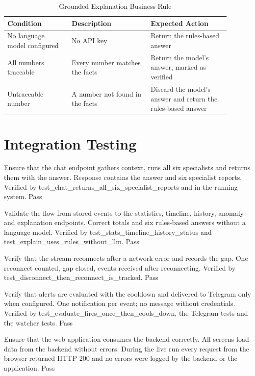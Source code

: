 {\renewcommand{\arraystretch}{1.3}
\begin{longtable}{|p{0.26\linewidth}|p{0.32\linewidth}|p{0.32\linewidth}|}
\caption{Grounded Explanation Business Rule}\label{tab:br-explain}\\\hline
\textbf{Condition} & \textbf{Description} & \textbf{Expected Action}\\\hline
No language model configured & No API key & Return the rules-based answer\\\hline
All numbers traceable & Every number matches the facts & Return the model's answer, marked as verified\\\hline
Untraceable number & A number not found in the facts & Discard the model's answer and return the rules-based answer\\\hline
\end{longtable}}

\section{Integration Testing}
{Ensure that the chat endpoint gathers context, runs all six specialists and returns them with the answer.}
{Response contains the answer and six specialist reports.}
{Verified by test\_chat\_returns\_all\_six\_specialist\_reports and in the running system.}
{Pass}

{Validate the flow from stored events to the statistics, timeline, history, anomaly and explanation endpoints.}
{Correct totals and six rules-based answers without a language model.}
{Verified by test\_stats\_timeline\_history\_status and test\_explain\_uses\_rules\_without\_llm.}
{Pass}

{Verify that the stream reconnects after a network error and records the gap.}
{One reconnect counted, gap closed, events received after reconnecting.}
{Verified by test\_disconnect\_then\_reconnect\_is\_tracked.}
{Pass}

{Verify that alerts are evaluated with the cooldown and delivered to Telegram only when configured.}
{One notification per event; no message without credentials.}
{Verified by test\_evaluate\_fires\_once\_then\_cools\_down, the Telegram tests and the watcher tests.}
{Pass}

{Ensure that the web application consumes the backend correctly.}
{All screens load data from the backend without errors.}
{During the live run every request from the browser returned HTTP 200 and no errors were logged by the backend or the application.}
{Pass}

